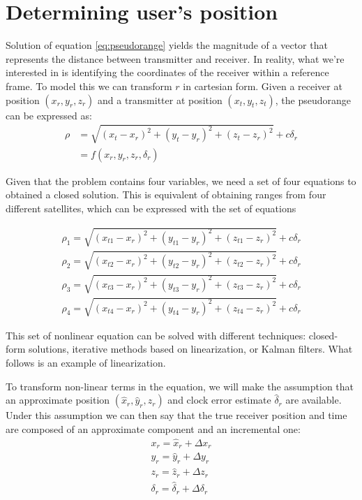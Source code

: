 \section{Determining user's position}
Solution of equation \ref{eq:pseudorange} yields the magnitude of a vector that
represents the distance between transmitter and receiver. In reality, what we're
interested in is identifying the coordinates of the receiver within a reference
frame. To model this we can transform $r$ in cartesian form. Given a
receiver at position $(x_r, y_r, z_r)$ and a transmitter at position $(x_t, y_t,
z_t)$, the pseudorange can be expressed as:
\begin{equation} \label{eq:expandedpseudorange}
  \begin{aligned}
    \rho &= \sqrt{(x_t - x_r)^2 + (y_t - y_r)^2 + (z_t - z_r)^2} + c\delta_r \\
    & = f(x_r, y_r, z_r, \delta_r)
  \end{aligned}
\end{equation}

Given that the problem contains four variables, we need a set of four equations to
obtained a closed solution. This is equivalent of obtaining ranges from four
different satellites, which can be expressed with the set of equations

\begin{equation} \label{eq:userpositionfull}
  \begin{array}{l}
  \rho_1 = \sqrt{(x_{t1} - x_r)^2 + (y_{t1} - y_r)^2 + (z_{t1} - z_r)^2} + c\delta_r \\
  \rho_2 = \sqrt{(x_{t2} - x_r)^2 + (y_{t2} - y_r)^2 + (z_{t2} - z_r)^2} + c\delta_r \\
  \rho_3 = \sqrt{(x_{t3} - x_r)^2 + (y_{t3} - y_r)^2 + (z_{t3} - z_r)^2} + c\delta_r \\
  \rho_4 = \sqrt{(x_{t4} - x_r)^2 + (y_{t4} - y_r)^2 + (z_{t4} - z_r)^2} + c\delta_r
  \end{array}
\end{equation}

This set of nonlinear equation can be solved with different techniques:
closed-form solutions, iterative methods based on linearization, or Kalman
filters. What follows is an example of linearization.

\par

To transform non-linear terms in the equation, we will make the assumption that
an approximate position $(\hat x_r, \hat y_r, \hat z_r)$ and clock error
estimate $\hat \delta_r$ are available. Under this assumption we can then say
that the true receiver position and time are composed of an approximate
component and an incremental one:
\begin{equation} \label{eq:incrementals}
  \begin{array}{l}
    x_r = \hat x_r + \Delta x_r \\
    y_r = \hat y_r + \Delta y_r \\
    z_r = \hat z_r + \Delta z_r \\
    \delta_r = \hat \delta_r + \Delta \delta_r
  \end{array}
\end{equation}

